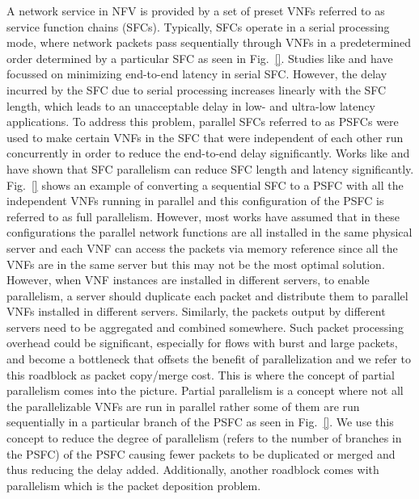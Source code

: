 \documentclass[journal]{IEEEtran}
\begin{document}
A network service in NFV is provided by a set of preset VNFs referred to as service function chains (SFCs). Typically, SFCs operate in a serial processing mode, where network packets pass sequentially through VNFs in a predetermined order determined by a particular SFC as seen in Fig.~\ref{}. Studies like \cite{JSAC} and \cite{TPDS-serial} have focussed on minimizing end-to-end latency in serial SFC.  However, the delay incurred by the SFC due to serial processing increases linearly with the SFC length, which leads to an unacceptable delay in low- and ultra-low latency applications. To address this problem, parallel SFCs referred to as PSFCs were used to make certain VNFs in the SFC that were independent of each other run concurrently in order to reduce the end-to-end delay significantly. Works like \cite{NFP} and \cite{Parabox} have shown that SFC parallelism can reduce SFC length and latency significantly. Fig.~\ref{} shows an example of converting a sequential SFC to a PSFC with all the independent VNFs running in parallel and this configuration of the PSFC is referred to as full parallelism. However, most works have assumed that in these configurations the parallel network functions are all installed in the same physical server and each VNF can access the packets via memory reference since all the VNFs are in the same server but this may not be the most optimal solution.
However, when VNF instances are installed in different servers, to enable parallelism, a server should duplicate each packet and distribute them to parallel VNFs installed in different servers. Similarly, the packets output by different servers need to be aggregated and combined somewhere. Such
packet processing overhead could be significant, especially for flows with burst and large packets, and become a bottleneck that offsets the benefit of parallelization and we refer to this roadblock as packet copy/merge cost. This is where the concept of partial parallelism comes into the picture. Partial parallelism is a concept where not all the parallelizable VNFs are run in parallel rather some of them are run sequentially in a particular branch of the PSFC as seen in Fig.~\ref{}. We use this concept to reduce the degree of parallelism (refers to the number of branches in the PSFC) of the PSFC causing fewer packets to be duplicated or merged and thus reducing the delay added. 
Additionally, another roadblock comes with parallelism which is the packet deposition problem.
\end{document}
